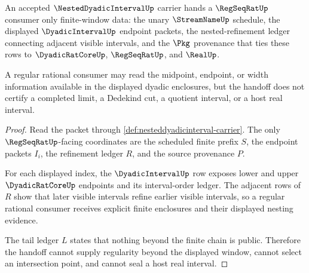 \begin{theorem}
\label{thm:nesteddyadicinterval-regseqrat-handoff}
An accepted $\NestedDyadicIntervalUp$ carrier hands a $\RegSeqRatUp$ consumer only finite-window data: the unary $\StreamNameUp$ schedule, the displayed $\DyadicIntervalUp$ endpoint packets, the nested-refinement ledger connecting adjacent visible intervals, and the $\Pkg$ provenance that ties these rows to $\DyadicRatCoreUp$, $\RegSeqRatUp$, and $\RealUp$.

A regular rational consumer may read the midpoint, endpoint, or width information available in the displayed dyadic enclosures, but the handoff does not certify a completed limit, a Dedekind cut, a quotient interval, or a host real interval.
\end{theorem}
\begin{proof}
Read the packet through \autoref{def:nesteddyadicinterval-carrier}. The only $\RegSeqRatUp$-facing coordinates are the scheduled finite prefix $S$, the endpoint packets $I_i$, the refinement ledger $R$, and the source provenance $P$.

For each displayed index, the $\DyadicIntervalUp$ row exposes lower and upper $\DyadicRatCoreUp$ endpoints and its interval-order ledger. The adjacent rows of $R$ show that later visible intervals refine earlier visible intervals, so a regular rational consumer receives explicit finite enclosures and their displayed nesting evidence.

The tail ledger $L$ states that nothing beyond the finite chain is public. Therefore the handoff cannot supply regularity beyond the displayed window, cannot select an intersection point, and cannot seal a host real interval.
\end{proof}

